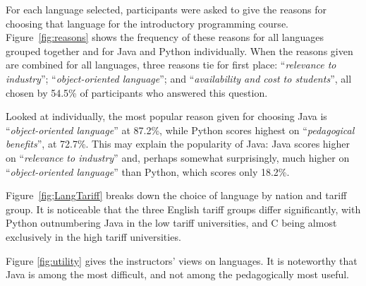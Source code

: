 \documentclass{sig-alternate}
\begin{document}
For each language selected, participants were asked to give the
reasons for choosing that language for the introductory programming
course. Figure~\ref{fig:reasons} shows the frequency of these reasons
for all languages grouped together and for Java and Python
individually. When the reasons given are combined for all languages,
three reasons tie for first place: ``{\emph{relevance to industry}}'';
``{\emph{object-oriented language}}''; and ``{\emph{availability and cost to
students}}'', all chosen by 54.5\% of participants who answered this
question.

Looked at individually, the most popular reason given for choosing
Java is ``{\emph{object-oriented language}}'' at 87.2\%, while Python scores
highest on ``{\emph{pedagogical benefits}}'', at 72.7\%. This may explain the
popularity of Java: Java scores higher on ``{\emph{relevance to industry}}''
and, perhaps somewhat surprisingly, much higher on ``{\emph{object-oriented
language}}'' than Python, which scores only 18.2\%.


Figure~\ref{fig;LangTariff} breaks down the choice of language by
nation and tariff group.  It is noticeable that the three English
tariff groups differ significantly, with Python outnumbering Java in
the low tariff universities, and C being almost exclusively in the
high tariff universities.



Figure \ref{fig:utility} gives the instructors' views on languages. It is noteworthy that Java is among the most difficult, and not among the pedagogically most useful.
\end{document}
